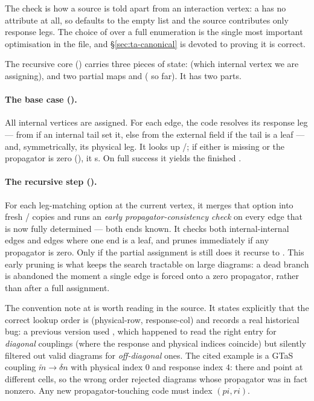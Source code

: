 The  check is how a source is told apart from an interaction
vertex: a  has no  attribute at all, so
 defaults to the empty list and the source contributes only
response legs. The choice of  over a full
 enumeration is the single most important optimisation in the file, and
\S\ref{sec:ta-canonical} is devoted to proving it is correct.

The recursive core  ()
carries three pieces of state:  (which internal vertex we are
assigning), and two partial maps  and 
( so far). It has two parts.

\paragraph{The base case ().} All internal vertices are assigned.
For each edge, the code resolves its response leg --- from 
if an internal tail set it, else from the external field if the tail is a leaf
--- and, symmetrically, its physical leg. It looks up /; if
either is missing or the propagator is zero (), it
s. On full success it yields the finished .

\paragraph{The recursive step ().} For each leg-matching option at
the current vertex, it merges that option into fresh /
 copies and runs an \emph{early propagator-consistency check} on
every edge that is now fully determined --- both ends known. It checks both
internal-internal edges and edges where one end is a leaf, and prunes immediately
if any propagator is zero. Only if the partial assignment is still
 does it recurse to . This early pruning
is what keeps the search tractable on large diagrams: a dead branch is abandoned
the moment a single edge is forced onto a zero propagator, rather than after a
full assignment.

\begin{gotcha}
The convention note at  is worth reading in
the source. It states explicitly that the correct lookup order is
 (physical-row, response-col) and records a real
historical bug: a previous version used \code{[ri, pi]}, which happened to read
the right entry for \emph{diagonal} couplings (where the response and physical
indices coincide) but silently filtered out valid diagrams for \emph{off-diagonal}
ones. The cited example is a GTaS coupling $\tilde m \to \delta n$ with physical
index $0$ and response index $4$: there \code{[ri, pi]} and \code{[pi, ri]} point
at different cells, so the wrong order rejected diagrams whose propagator was in
fact nonzero. Any new propagator-touching code must index $(pi, ri)$.
\end{gotcha}


